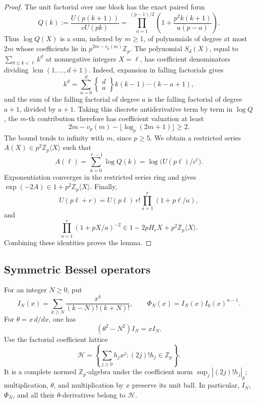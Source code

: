 \documentclass[11pt,a4paper]{article}
\theoremstyle{definition}\newtheorem{definition}[theorem]{Definition}
\theoremstyle{remark}\newtheorem{remark}[theorem]{Remark}
\numberwithin{equation}{section}
\begin{document}
\begin{proof}
The unit factorial over one block has the exact paired form
\[
 Q(k):=\frac{U(p(k+1))}{cU(pk)}
 =\prod_{a=1}^{(p-1)/2}
       \left(1+\frac{p^2k(k+1)}{a(p-a)}\right).
\]
Thus \(\log Q(X)\) is a sum, indexed by \(m\geq1\), of
polynomials of degree at most \(2m\) whose coefficients lie in
\(p^{2m-v_p(m)}\mathbb Z_p\).
The polynomial \(S_d(X)\), equal to
\(\sum_{0\leq k<\ell}k^d\) at nonnegative integers
\(X=\ell\), has coefficient denominators dividing
\(\operatorname{lcm}(1,\ldots,d+1)\).  Indeed, expansion in
falling factorials gives
\[
 k^d=\sum_{a=0}^d
 \left\{\begin{matrix}d\\a\end{matrix}\right\}
 k(k-1)\cdots(k-a+1),
\]
and the sum of the falling factorial of degree \(a\) is the
falling factorial of degree \(a+1\), divided by \(a+1\).
Taking this discrete antiderivative term by term in
\(\log Q\), the \(m\)-th contribution therefore has
coefficient valuation at least
\[
 2m-v_p(m)-\lfloor\log_p(2m+1)\rfloor\geq2.
\]
The bound tends to infinity with \(m\), since \(p\geq5\).
We obtain a restricted series
\(A(X)\in p^2\mathbb Z_p\langle X\rangle\) such that
\[
 A(\ell)=\sum_{k=0}^{\ell-1}\log Q(k)
 =\log\bigl(U(p\ell)/c^\ell\bigr).
\]
Exponentiation converges in the restricted series ring and gives
\(\exp(-2A)\in1+p^2\mathbb Z_p\langle X\rangle\).
Finally,
\[
 U(p\ell+r)=U(p\ell)\,r!
                \prod_{a=1}^r(1+p\ell/a),
\]
and
\[
 \prod_{a=1}^r(1+pX/a)^{-2}
 \in1-2pH_rX+p^2\mathbb Z_p\langle X\rangle.
\]
Combining these identities proves the lemma.
\end{proof}

\subsection{Symmetric Bessel operators}

For an integer \(N\geq0\), put
\[
 I_N(x)=\sum_{k\geq N}\frac{x^k}{(k-N)!(k+N)!},\qquad
 \Phi_N(x)=I_N(x)I_0(x)^{n-1}.
\]
For \(\theta=x\,d/dx\), one has
\[
 (\theta^2-N^2)I_N=xI_N.
\]
Use the factorial coefficient lattice
\[
 \mathcal H=\left\{\sum_{j\geq0}h_jx^j:
                          (2j)!h_j\in\mathbb Z_p\right\}.
\]
It is a complete normed \(\mathbb Z_p\)-algebra under the coefficient
norm \(\sup_j|(2j)!h_j|_p\); multiplication, \(\theta\),
and multiplication by \(x\) preserve its unit ball.
In particular, \(I_N\), \(\Phi_N\), and all their
\(\theta\)-derivatives belong to \(\mathcal H\).
\end{document}
